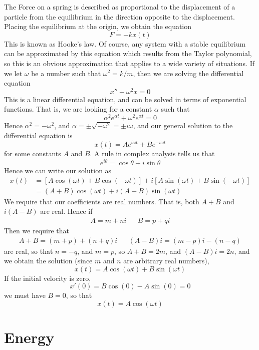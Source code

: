 The Force on a spring is described as proportional to the displacement of a particle from the equilibrium in the direction opposite to the displacement. Placing the equilibrium at the origin, we obtain the equation
%
\[ F = -kx(t) \]
%
This is known as Hooke's law. Of course, any system with a stable equilibrium can be approximated by this equation which results from the Taylor polynomial, so this is an obvious approximation that applies to a wide variety of situations. If we let $\omega$ be a number such that $\omega^2 = k/m$, then we are solving the differential equation
%
\[ x'' + \omega^2 x = 0 \]
%
This is a linear differential equation, and can be solved in terms of exponential functions. That is, we are looking for a constant $\alpha$ such that
%
\[ \alpha^2 e^{\alpha t} + \omega^2 e^{\alpha t} = 0 \]
%
Hence $\alpha^2 = -\omega^2$, and $\alpha = \pm \sqrt{-\omega^2} = \pm i \omega$, and our general solution to the differential equation is
%
\[ x(t) = Ae^{i \omega t} + Be^{-i \omega t} \]
%
for some constants $A$ and $B$. A rule in complex analysis tells us that
%
\[ e^{i \theta} = \cos \theta + i \sin \theta \]
%
Hence we can write our solution as
%
\begin{align*}
    x(t) &= [A \cos (\omega t) + B \cos (- \omega t)] + i [A \sin (\omega t) + B \sin (- \omega t)]\\
         &= (A + B) \cos(\omega t) + i (A - B) \sin(\omega t)
\end{align*}
%
We require that our coefficients are real numbers. That is, both $A + B$ and $i(A - B)$ are real. Hence if
%
\begin{align*} A = m + ni && B = p + qi \end{align*}
%
Then we require that
%
\begin{align*} A + B = (m + p) + (n + q)i && (A - B)i = (m - p)i - (n - q) \end{align*}
%
are real, so that $n = -q$, and $m = p$, so $A + B = 2m$, and $(A - B)i = 2n$, and we obtain the solution (since $m$ and $n$ are arbitrary real numbers),
%
\[ x(t) = A \cos(\omega t) + B \sin(\omega t) \]
%
If the initial velocity is zero,
%
\[ x'(0) = B \cos (0) - A \sin (0) = 0 \]
%
we must have $B = 0$, so that
%
\[ x(t) = A \cos (\omega t) \]




\chapter{Energy}

